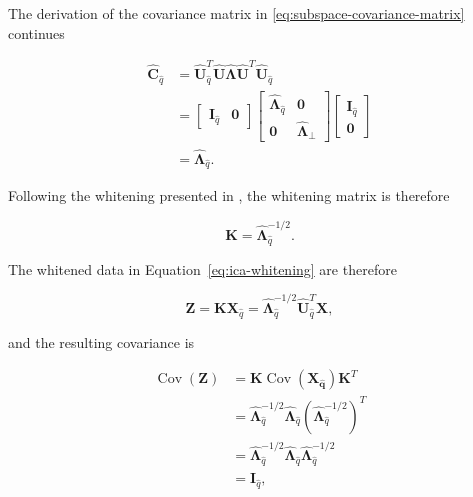 \documentclass[english]{pwr_wmat_praca_dyplomowa}
\theoremstyle{definition}
\theoremstyle{remark}
\begin{document}
The derivation of the covariance matrix in \eqref{eq:subspace-covariance-matrix} continues 

\begin{equation}
    \begin{aligned}
        \widehat{\mathbf{C}}_{\widehat{q}}
        &= \widehat{\mathbf{U}}_{\widehat{q}}^T \widehat{\mathbf{U}} \widehat{\boldsymbol{\Lambda}} \widehat{\mathbf{U}}^T \widehat{\mathbf{U}}_{\widehat{q}} \\
        &= 
            \begin{bmatrix} 
                \mathbf{I}_{\widehat{q}} & \mathbf{0} 
            \end{bmatrix} 
            \begin{bmatrix}
                \widehat{\boldsymbol{\Lambda}}_{\widehat{q}} & \mathbf{0} \\
                \mathbf{0} & \widehat{\boldsymbol{\Lambda}}_\perp     
            \end{bmatrix}
            \begin{bmatrix} 
                \mathbf{I}_{\widehat{q}} \\ \mathbf{0} 
            \end{bmatrix} \\
        &= \widehat{\boldsymbol{\Lambda}}_{\widehat{q}}.
    \end{aligned}
\end{equation}

Following the whitening presented in \cite[Equation 7.20]{ica}, the whitening matrix is therefore 

\begin{equation}
    \mathbf{K} = \widehat{\boldsymbol{\Lambda}}_{\widehat{q}}^{-1/2}.
\end{equation}

The whitened data in Equation~\eqref{eq:ica-whitening} are therefore

\begin{equation}
    \mathbf{Z} =  \mathbf{K}\mathbf{X}_{\widehat{q}}
    = \widehat{\boldsymbol{\Lambda}}_{\widehat{q}}^{-1/2} \widehat{\mathbf{U}}_{\widehat{q}}^T \mathbf{X},
\end{equation}

and the resulting covariance is

\begin{equation}
    \begin{aligned}
        \operatorname{Cov}(\mathbf{Z}) 
        &= \mathbf{K} \operatorname{Cov}(\mathbf{X_{\widehat{q}}}) \mathbf{K}^T \\
        &= \widehat{\boldsymbol{\Lambda}}_{\widehat{q}}^{-1/2} \widehat{\boldsymbol{\Lambda}}_{\widehat{q}} \left(\widehat{\boldsymbol{\Lambda}}_{\widehat{q}}^{-1/2} \right)^T \\
        &= \widehat{\boldsymbol{\Lambda}}_{\widehat{q}}^{-1/2} \widehat{\boldsymbol{\Lambda}}_{\widehat{q}} \widehat{\boldsymbol{\Lambda}}_{\widehat{q}}^{-1/2} \\
        &= \mathbf{I}_{\widehat{q}},
    \end{aligned}
\end{equation}
\end{document}
